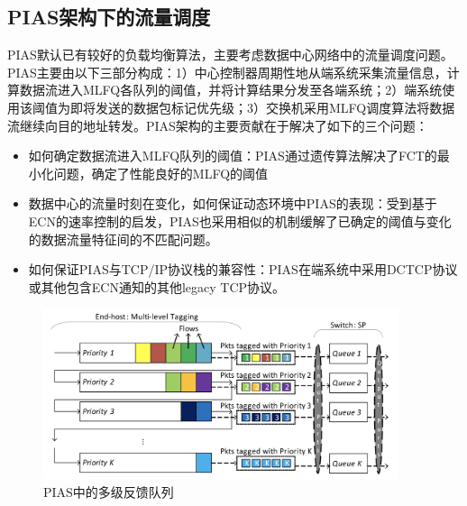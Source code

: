 \subsection{PIAS架构下的流量调度}

PIAS\cite{bai2015pias}默认已有较好的负载均衡算法，主要考虑数据中心网络中的流量调度问题。PIAS主要由以下三部分构成：1）中心控制器周期性地从端系统采集流量信息，计算数据流进入MLFQ各队列的阈值，并将计算结果分发至各端系统；2）端系统使用该阈值为即将发送的数据包标记优先级；3）交换机采用MLFQ调度算法将数据流继续向目的地址转发。PIAS架构的主要贡献在于解决了如下的三个问题：
\begin{itemize}
    \item 如何确定数据流进入MLFQ队列的阈值：PIAS通过遗传算法解决了FCT的最小化问题，确定了性能良好的MLFQ的阈值
    \item 数据中心的流量时刻在变化，如何保证动态环境中PIAS的表现：受到基于ECN的速率控制\cite{alizadeh2010dctcp}的启发，PIAS也采用相似的机制缓解了已确定的阈值与变化的数据流量特征间的不匹配问题。
    \item 如何保证PIAS与TCP/IP协议栈的兼容性：PIAS在端系统中采用DCTCP协议或其他包含ECN通知的其他legacy TCP协议。
\end{itemize}
\begin{figure}[ht]
\centering
\includegraphics[height=5cm]{figure/PIAS_archi.png}
\caption{PIAS中的多级反馈队列}
\label{fig:PIAS}
\end{figure}